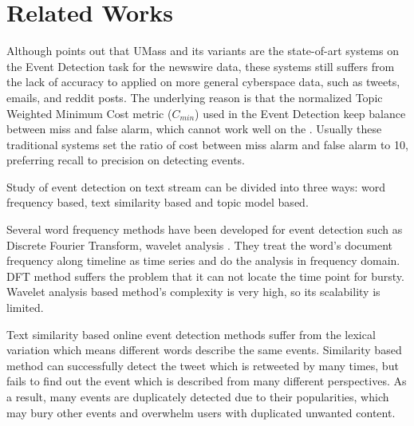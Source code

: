 \documentclass[conference,compsoc]{IEEEtran}
\begin{document}
\section{Related Works}
Although \cite{Wurzer:2015wq} points out that UMass\cite{Allan:2000wu} and its variants\cite{Petrovic:2010uj}\cite{petrovic2012using}\cite{Wurzer:2015wq} are the state-of-art systems on the Event Detection task for the newswire data, these systems still suffers from the lack of accuracy to applied on more general cyberspace data, such as tweets, emails, and reddit posts. 
The underlying reason is that the normalized Topic Weighted Minimum Cost metric (\(C_{min}\)) used in the Event Detection keep balance between miss and false alarm, which cannot work well on the .
Usually these traditional systems set the ratio of cost between miss alarm and false alarm to 10, preferring recall to precision on detecting events.

Study of event detection on text stream can be divided into three ways: word frequency based, text similarity based and topic model based.

Several word frequency methods have been developed for event detection such as Discrete Fourier Transform\cite{he2007analyzingDFT}, wavelet analysis \cite{weng2011eventWavelet}.
They treat the word's document frequency along timeline as time series and do the analysis in frequency domain. 
DFT method suffers the problem that it can not locate the time point for bursty.
Wavelet analysis based method's complexity is very high, so its scalability is limited. 

 Text similarity based online event detection methods\cite{petrovic2010streaming}\cite{mccreadiescalable}  suffer from the lexical variation which means different words describe the same events.
 Similarity based method can successfully detect the tweet which is retweeted by many times, but fails to find out the event which is described from many different perspectives.
 As a result, many events are duplicately detected due to their popularities, which may bury other events and overwhelm users with duplicated unwanted content.
\end{document}
